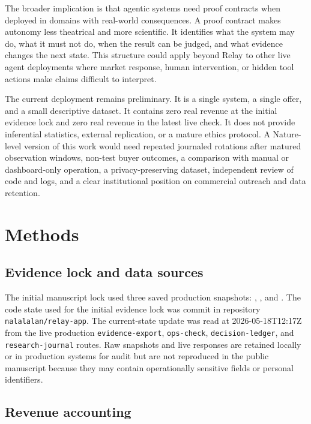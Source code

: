 \documentclass[12pt,letterpaper]{article}
\begin{document}
The broader implication is that agentic systems need proof contracts when deployed in domains with real-world consequences. A proof contract makes autonomy less theatrical and more scientific. It identifies what the system may do, what it must not do, when the result can be judged, and what evidence changes the next state. This structure could apply beyond Relay to other live agent deployments where market response, human intervention, or hidden tool actions make claims difficult to interpret.

The current deployment remains preliminary. It is a single system, a single offer, and a small descriptive dataset. It contains zero real revenue at the initial evidence lock and zero real revenue in the latest live check. It does not provide inferential statistics, external replication, or a mature ethics protocol. A Nature-level version of this work would need repeated journaled rotations after matured observation windows, non-test buyer outcomes, a comparison with manual or dashboard-only operation, a privacy-preserving dataset, independent review of code and logs, and a clear institutional position on commercial outreach and data retention.

\section{Methods}

\subsection{Evidence lock and data sources}

The initial manuscript lock used three saved production snapshots: \texttt{}, \texttt{}, and \texttt{}. The code state used for the initial evidence lock was commit \texttt{} in repository \texttt{nalalalan/relay-app}. The current-state update was read at 2026-05-18T12:17Z from the live production \texttt{evidence-export}, \texttt{ops-check}, \texttt{decision-ledger}, and \texttt{research-journal} routes. Raw snapshots and live responses are retained locally or in production systems for audit but are not reproduced in the public manuscript because they may contain operationally sensitive fields or personal identifiers.

\subsection{Revenue accounting}
\end{document}
